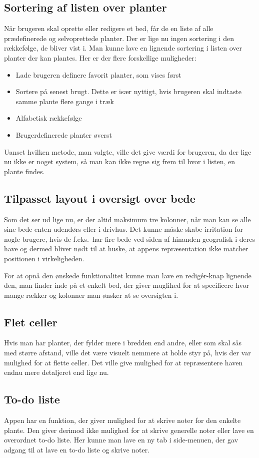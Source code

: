 \subsection{Sortering af listen over planter}
Når brugeren skal oprette eller redigere et bed, får de en liste af alle prædefinerede og selvoprettede planter. Der er lige nu ingen sortering i den rækkefølge, de bliver vist i.  Man kunne lave en lignende sortering i listen over planter der kan plantes. Her er der flere forskellige muligheder:
\begin{itemize}
   \item Lade brugeren definere favorit planter, som vises først
   \item Sortere på senest brugt. Dette er især nyttigt, hvis brugeren skal indtaste samme plante flere gange i træk
   \item Alfabetisk rækkefølge
   \item Brugerdefinerede planter øverst
\end{itemize}

Uanset hvilken metode, man valgte, ville det give værdi for brugeren, da der lige nu ikke er noget system, så man kan ikke regne sig frem til hvor i listen, en plante findes.

\subsection{Tilpasset layout i oversigt over bede}
Som det ser ud lige nu, er der altid maksimum tre kolonner, når man kan se alle sine bede enten udendørs eller i drivhus. Det kunne måske skabe irritation for nogle brugere, hvis de f.eks.\ har fire bede ved siden af hinanden geografisk i deres have og dermed bliver nødt til at huske, at appens repræsentation ikke matcher positionen i virkeligheden. 

For at opnå den ønskede funktionalitet kunne man lave en redigér-knap lignende den, man finder inde på et enkelt bed, der giver muglihed for at specificere hvor mange rækker og kolonner man ønsker at se oversigten i.

\subsection{Flet celler}
Hvis man har planter, der fylder mere i bredden end andre, eller som skal sås med større afstand, ville det være visuelt nemmere at holde styr på, hvis der var mulighed for at flette celler. Det ville give mulighed for at repræsentere haven endnu mere detaljeret end lige nu.

\subsection{To-do liste}
Appen har en funktion, der giver mulighed for at skrive noter for den enkelte plante. Den giver derimod ikke mulighed for at skrive generelle noter eller lave en overordnet to-do liste. Her kunne man lave en ny tab i side-menuen, der gav adgang til at lave en to-do liste og skrive noter.
